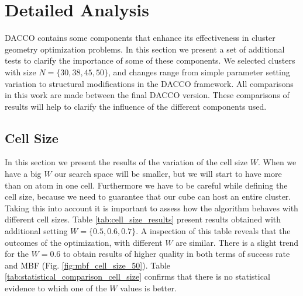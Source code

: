 		\section{Detailed Analysis}
		\label{sec:detailed_analysis}
		
		DACCO contains some components that enhance its effectiveness in cluster geometry optimization problems. In this section we present a set of additional tests to clarify the importance of some of these components. We selected clusters with size $N=\{30, 38, 45, 50\}$, and changes range from simple parameter setting variation to structural modifications in the DACCO framework. All comparisons in this work are made between the final DACCO version. These comparisons of results will help to clarify the influence of the different components used.
		
		
		\subsection{Cell Size}
		In this section we present the results of the variation of the cell size $W$. When we have a big $W$ our search space will be smaller, but we will start to have more than on atom in one cell. Furthermore we have to be careful while defining the cell size, because we need to guarantee that our cube can host an entire cluster. Taking this into account it is important to assess how the algorithm behaves with different cell sizes.
		Table \ref{tab:cell_size_results} present results obtained with additional setting $W=\{0.5, 0.6, 0.7\}$. A inspection of this table reveals that the outcomes of the optimization, with different $W$ are similar.
		There is a slight trend for the $W=0.6$ to obtain results of higher quality in both terms of success rate and MBF (Fig. \ref{fig:mbf_cell_size_50}).
		Table \ref{tab:statistical_comparison_cell_size} confirms that there is no statistical evidence to which one of the $W$ values is better.
		   		
